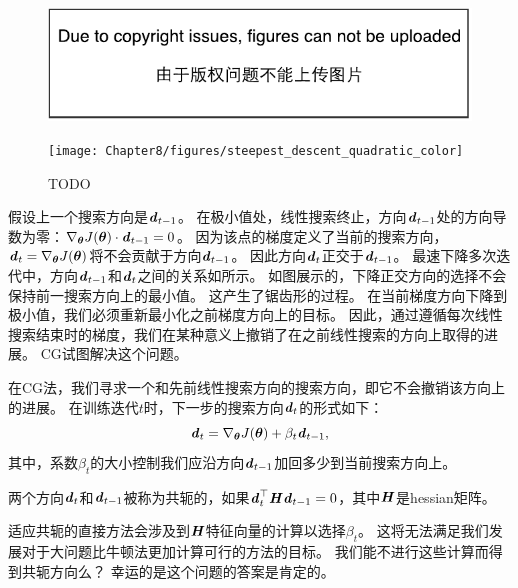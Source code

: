 \begin{figure}[!htb]
\ifOpenSource
\centerline{\includegraphics{figure.pdf}}
\else
\centerline{\texttt{[image: Chapter8/figures/steepest\_descent\_quadratic\_color]}}
\fi
\caption{TODO}
\label{fig:chap8_steepest_descent_quadratic}
\end{figure}



假设上一个搜索方向是$\boldsymbol{\mathit{d}}_{t-1}$。   
在极小值处，线性搜索终止，方向$\boldsymbol{\mathit{d}}_{t-1}$处的方向导数为零：$\nabla_{\boldsymbol{\theta}} J(\boldsymbol{\theta}) \cdot \boldsymbol{\mathit{d}}_{t-1} = 0$。
因为该点的梯度定义了当前的搜索方向，$\boldsymbol{\mathit{d}}_t = \nabla_{\boldsymbol{\theta}} J(\boldsymbol{\theta})$将不会贡献于方向$\boldsymbol{\mathit{d}}_{t-1}$。
因此方向$\boldsymbol{\mathit{d}}_t$正交于$\boldsymbol{\mathit{d}}_{t-1}$。
最速下降多次迭代中，方向$\boldsymbol{\mathit{d}}_{t-1}$和$\boldsymbol{\mathit{d}}_t$之间的关系如所示。
如图展示的，下降正交方向的选择不会保持前一搜索方向上的最小值。
这产生了锯齿形的过程。
在当前梯度方向下降到极小值，我们必须重新最小化之前梯度方向上的目标。
因此，通过遵循每次线性搜索结束时的梯度，我们在某种意义上撤销了在之前线性搜索的方向上取得的进展。
\gls{CG}试图解决这个问题。

在\gls{CG}法，我们寻求一个和先前线性搜索方向的搜索方向，即它不会撤销该方向上的进展。
在训练迭代$t$时，下一步的搜索方向$\boldsymbol{\mathit{d}}_t$的形式如下：
\begin{equation}
    \boldsymbol{\mathit{d}}_t = \nabla_{\boldsymbol{\theta}} J(\boldsymbol{\theta}) + \beta_t \boldsymbol{\mathit{d}}_{t-1},
\end{equation}
其中，系数$\beta_t$的大小控制我们应沿方向$\boldsymbol{\mathit{d}}_{t-1}$加回多少到当前搜索方向上。


两个方向$\boldsymbol{\mathit{d}}_t$和$\boldsymbol{\mathit{d}}_{t-1}$被称为共轭的，如果$\boldsymbol{\mathit{d}}_t^\top \boldsymbol{\mathit{H}} \boldsymbol{\mathit{d}}_{t-1} = 0$，其中$\boldsymbol{\mathit{H}}$是\gls{hessian}矩阵。

适应共轭的直接方法会涉及到$\boldsymbol{\mathit{H}}$特征向量的计算以选择$\beta_t$。
这将无法满足我们发展对于大问题比牛顿法更加计算可行的方法的目标。
我们能不进行这些计算而得到共轭方向么？
幸运的是这个问题的答案是肯定的。

